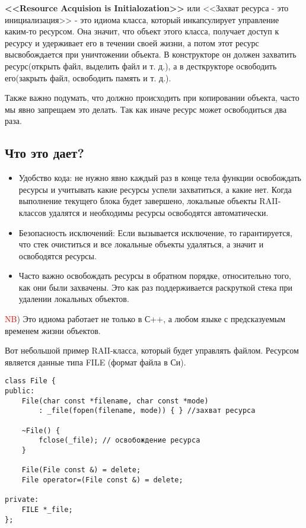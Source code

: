 \textbf{<<Resource Acquision is Initialozation>>} или <<Захват ресурса - это инициализация>> - это идиома класса, который инкапсулирует управление каким-то ресурсом. Она значит, что объект этого класса, получает доступ к ресурсу и удерживает его в течении своей жизни, а потом этот ресурс высвобождается при уничтожении объекта.
В конструкторе он должен захватить ресурс(открыть файл, выделить файл и т. д.), а в десткрукторе освободить его(закрыть файл, освободить память и т. д.).

Также важно подумать, что должно происходить при копировании объекта, часто мы явно запрещаем это делать. Так как иначе ресурс может освободиться два раза.

\subsection{Что это дает?}
\begin{itemize}
\item Удобство кода: не нужно явно каждый раз в конце тела функции освобождать ресурсы и учитывать какие ресурсы успели захватиться, а какие нет. Когда выполнение текущего блока будет завершено, локальные объекты RAII-классов удалятся и необходимы ресурсы освободятся автоматически.
\item Безопасность исключений: Если вызывается исключение, то гарантируется, что стек очиститься и все локальные объекты удаляться, а значит и освободятся ресурсы.
\item Часто важно освобождать ресурсы в обратном порядке, относительно того, как они были захвачены. Это как раз поддерживается раскруткой стека при удалении локальных объектов.
\end{itemize}

\textcolor{red}{NB}) Это идиома работает не только в С++, а любом языке с предсказуемым временем жизни объектов.


Вот небольшой пример RAII-класса, который будет управлять файлом.
Ресурсом является данные типа FILE (формат файла в Си).
\begin{verbatim}
class File {
public:
    File(char const *filename, char const *mode)
        : _file(fopen(filename, mode)) { } //захват ресурса

    ~File() {
        fclose(_file); // освобождение ресурса
    }

    File(File const &) = delete;
    File operator=(File const &) = delete;

private:
    FILE *_file;
};
\end{verbatim}

